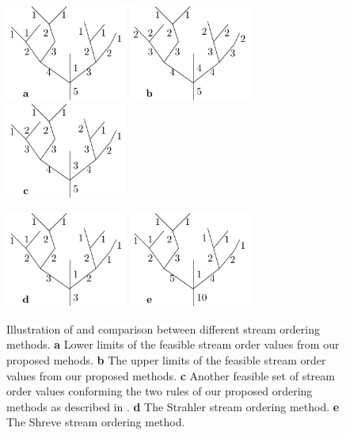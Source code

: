 \documentclass[water,article,submit,pdftex,moreauthors]{Definitions/mdpi}
\begin{document}
\begin{figure}[H]
    \begin{center}
        \includegraphics[width=4cm]{fig/stream_order.pdf}
        \hspace{0.5cm}
        \includegraphics[width=4cm]{fig/stream_order_r.pdf}
        \hspace{0.5cm}
        \includegraphics[width=4cm]{fig/stream_order_a.pdf}

        \includegraphics[width=4cm]{fig/stream_order_strahler.pdf}
        \hspace{0.5cm}
        \includegraphics[width=4cm]{fig/stream_order_shreve.pdf}
    \end{center}
    \caption{Illustration of and comparison between different stream ordering methods. \textbf{a} Lower limits of the feasible stream order values from our proposed mehods. \textbf{b} The upper limits of the feasible stream order values from our proposed methods. \textbf{c} Another feasible set of stream order values conforming the two rules of our proposed ordering methods as described in . \textbf{d} The Strahler stream ordering method. \textbf{e} The Shreve stream ordering method. \label{fig:zheng_order}}
\end{figure}
\end{document}
